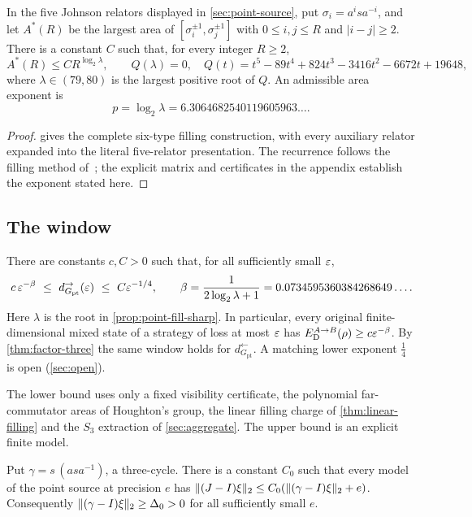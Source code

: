 \begin{fillingproposition}\label{prop:point-fill-sharp}
In the five Johnson relators displayed in \cref{sec:point-source}, put $\sigma_i=a^isa^{-i}$, and let $A^*(R)$ be the largest area of
$[\sigma_i^{\pm1},\sigma_j^{\pm1}]$ with $0\le i,j\le R$ and $|i-j|\ge2$. There is a constant $C$ such that, for every integer $R\ge2$,
\[
 A^*(R)\le CR^{\log_2\lambda},\qquad
 Q(\lambda)=0,\quad Q(t)=t^5-89t^4+824t^3-3416t^2-6672t+19648,
\]
where $\lambda\in(79,80)$ is the largest positive root of $Q$. An admissible area exponent is
\[
 p=\log_2\lambda=6.3064682540119605963\ldots .
\]
\end{fillingproposition}
\begin{proof}
 gives the complete six-type filling construction, with every auxiliary relator expanded into the literal five-relator presentation. The recurrence follows the filling method of~\cite{DM-H3}; the explicit matrix and certificates in the appendix establish the exponent stated here.
\end{proof}

\subsection{The window}\label{sec:point-window}

\begin{theorem}\label{thm:point-window}
There are constants $c,C>0$ such that, for all sufficiently small $\varepsilon$,
\[
c\,\eps^{-\beta}\ \le\ d_{G_{\mathrm{pt}}}^\to(\eps)\ \le\ C\eps^{-1/4},\qquad
\beta=\frac1{2\log_2\lambda+1}=0.0734595360384268649\ldots .
\]
Here $\lambda$ is the root in \cref{prop:point-fill-sharp}. In particular, every original finite-dimensional mixed state of a strategy of loss at most $\varepsilon$ has $E_{\mathrm D}^{A\to B}(\rho)\ge c\varepsilon^{-\beta}$.
By \cref{thm:factor-three} the same window holds for $d^\leftarrow_{G_{\mathrm{pt}}}$. A matching lower exponent $\frac14$ is open
(\cref{sec:open}).
\end{theorem}

The lower bound uses only a fixed visibility certificate, the polynomial far-commutator areas of Houghton's group, the linear
filling charge of \cref{thm:linear-filling} and the $S_3$ extraction of \cref{sec:aggregate}. The upper bound is an explicit
finite model.

\begin{lemma}\label{lem:point-visibility}
Put $\gamma=s\,(asa^{-1})$, a three-cycle. There is a constant $C_0$ such that every model of the point source at precision $e$
has $\lVert (J-I)\xi\rVert_2\le C_0(\lVert (\gamma-I)\xi\rVert_2+e)$. Consequently $\lVert (\gamma-I)\xi\rVert_2\ge\Delta_0>0$ for all sufficiently small $e$.
\end{lemma}

